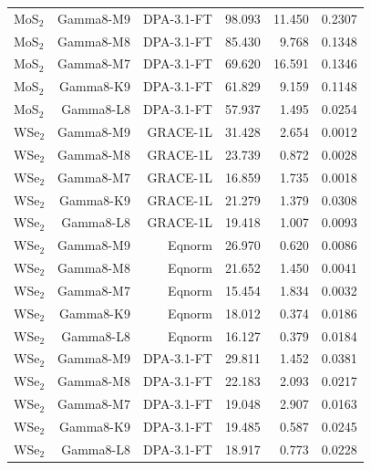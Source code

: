 \begin{tabular}{lrrrrr}
MoS$_2$ & Gamma8-M9 & DPA-3.1-FT & 98.093 & 11.450 & 0.2307 \\
MoS$_2$ & Gamma8-M8 & DPA-3.1-FT & 85.430 & 9.768 & 0.1348 \\
MoS$_2$ & Gamma8-M7 & DPA-3.1-FT & 69.620 & 16.591 & 0.1346 \\
MoS$_2$ & Gamma8-K9 & DPA-3.1-FT & 61.829 & 9.159 & 0.1148 \\
MoS$_2$ & Gamma8-L8 & DPA-3.1-FT & 57.937 & 1.495 & 0.0254 \\
WSe$_2$ & Gamma8-M9 & GRACE-1L & 31.428 & 2.654 & 0.0012 \\
WSe$_2$ & Gamma8-M8 & GRACE-1L & 23.739 & 0.872 & 0.0028 \\
WSe$_2$ & Gamma8-M7 & GRACE-1L & 16.859 & 1.735 & 0.0018 \\
WSe$_2$ & Gamma8-K9 & GRACE-1L & 21.279 & 1.379 & 0.0308 \\
WSe$_2$ & Gamma8-L8 & GRACE-1L & 19.418 & 1.007 & 0.0093 \\
WSe$_2$ & Gamma8-M9 & Eqnorm & 26.970 & 0.620 & 0.0086 \\
WSe$_2$ & Gamma8-M8 & Eqnorm & 21.652 & 1.450 & 0.0041 \\
WSe$_2$ & Gamma8-M7 & Eqnorm & 15.454 & 1.834 & 0.0032 \\
WSe$_2$ & Gamma8-K9 & Eqnorm & 18.012 & 0.374 & 0.0186 \\
WSe$_2$ & Gamma8-L8 & Eqnorm & 16.127 & 0.379 & 0.0184 \\
WSe$_2$ & Gamma8-M9 & DPA-3.1-FT & 29.811 & 1.452 & 0.0381 \\
WSe$_2$ & Gamma8-M8 & DPA-3.1-FT & 22.183 & 2.093 & 0.0217 \\
WSe$_2$ & Gamma8-M7 & DPA-3.1-FT & 19.048 & 2.907 & 0.0163 \\
WSe$_2$ & Gamma8-K9 & DPA-3.1-FT & 19.485 & 0.587 & 0.0245 \\
WSe$_2$ & Gamma8-L8 & DPA-3.1-FT & 18.917 & 0.773 & 0.0228 \\
\bottomrule
\end{tabular}
